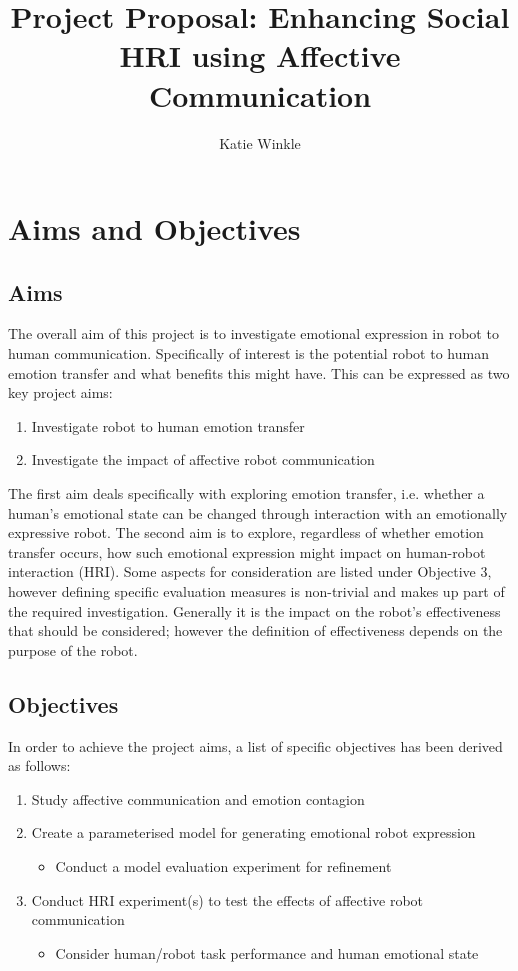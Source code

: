 \documentclass[11pt]{article}
\title{Project Proposal: Enhancing Social HRI using Affective Communication}
\author{Katie Winkle}
\begin{document}
\maketitle

\section{Aims and Objectives}
\subsection{Aims}
The overall aim of this project is to investigate emotional expression in robot to human communication. Specifically of interest is the potential robot to human emotion transfer and what benefits this might have. This can be expressed as two key project aims:

\begin{enumerate}
\item Investigate robot to human emotion transfer
\item Investigate the impact of affective robot communication
\end{enumerate}

The first aim deals specifically with exploring emotion transfer, i.e. whether a human's emotional state can be changed through interaction with an emotionally expressive robot. The second aim is to explore, regardless of whether emotion transfer occurs, how such emotional expression might impact on human-robot interaction (HRI). Some aspects for consideration are listed under Objective 3, however defining specific evaluation measures is non-trivial and makes up part of the required investigation. Generally it is the impact on the robot's effectiveness that should be considered; however the definition of effectiveness depends on the purpose of the robot. 

\subsection{Objectives}
In order to achieve the project aims, a list of specific objectives has been derived as follows: 
\begin{enumerate}
\item Study affective communication and emotion contagion
\item Create a parameterised model for generating emotional robot expression
\begin{itemize}
\item Conduct a model evaluation experiment for refinement
\end{itemize}
\item Conduct HRI experiment(s) to test the effects of affective robot communication
\begin{itemize}
\item Consider human/robot task performance and human emotional state
\end{itemize}
\end{enumerate}
\end{document}
